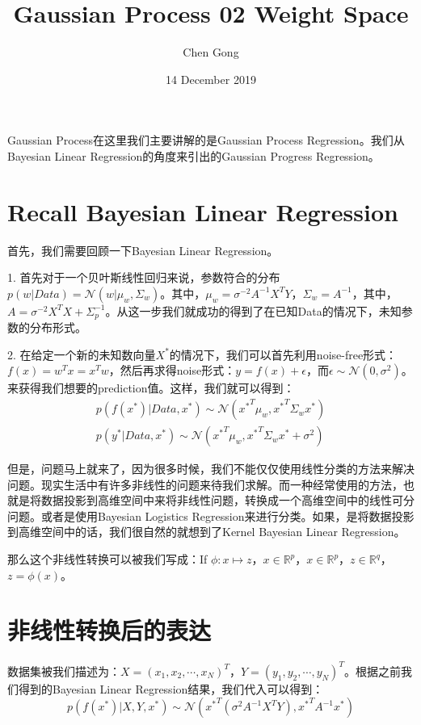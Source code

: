 \documentclass[a4paper]{article}
\title{Gaussian Process 02 Weight Space}
\author{Chen Gong}
\date{14 December 2019}
\begin{document}
\maketitle
Gaussian Process在这里我们主要讲解的是Gaussian Process Regression。我们从Bayesian Linear Regression的角度来引出的Gaussian Progress Regression。

\section{Recall Bayesian Linear Regression}
首先，我们需要回顾一下Bayesian Linear Regression。

1. 首先对于一个贝叶斯线性回归来说，参数符合的分布$p(w|Data) = \mathcal{N}(w|\mu_w,\Sigma_w)$。其中，$\mu_w = \sigma^{-2}A^{-1}X^TY$，$\Sigma_w = A^{-1}$，其中，$A=\sigma^{-2}X^TX+\Sigma_p^{-1}$。从这一步我们就成功的得到了在已知Data的情况下，{\color{red}未知参数的分布形式}。

2. 在给定一个新的未知数向量$X^\ast$的情况下，我们可以首先利用noise-free形式：$f(x) = w^Tx = x^Tw$，然后再求得noise形式：$y=f(x)+\epsilon$，而$\epsilon \sim \mathcal{N}(0,\sigma^2)$。来获得我们想要的prediction值。这样，我们就可以得到：
\begin{gather}
    p(f(x^\ast)|Data,x^\ast) \sim \mathcal{N}({x^\ast}^T\mu_w, {x^\ast}^T\Sigma_w{x^\ast}) \\
    p(y^\ast|Data,x^\ast) \sim \mathcal{N}({x^\ast}^T\mu_w, {x^\ast}^T\Sigma_w{x^\ast}+\sigma^2)
\end{gather}

但是，问题马上就来了，因为很多时候，我们不能仅仅使用线性分类的方法来解决问题。现实生活中有许多非线性的问题来待我们求解。而一种经常使用的方法，也就是将数据投影到高维空间中来将非线性问题，转换成一个高维空间中的线性可分问题。或者是使用Bayesian Logistics Regression来进行分类。如果，是将数据投影到高维空间中的话，我们很自然的就想到了Kernel Bayesian Linear Regression。

那么这个非线性转换可以被我们写成：If $\phi:x\mapsto z$，$x\in \mathbb{R}^p$，$x\in\mathbb{R}^p$，$z\in\mathbb{R}^q$，$z=\phi(x)$。

\section{非线性转换后的表达}
数据集被我们描述为：$X = (x_1,x_2,\cdots,x_N)^T$，$Y = (y_1,y_2,\cdots,y_N)^T$。根据之前我们得到的Bayesian Linear Regression结果，我们代入可以得到：
\begin{equation}
    p(f(x^\ast)|X,Y,x^\ast) \sim \mathcal{N}({x^\ast}^T(\sigma^{2}A^{-1}X^TY),{x^\ast}^TA^{-1}x^\ast)
\end{equation}
\end{document}
